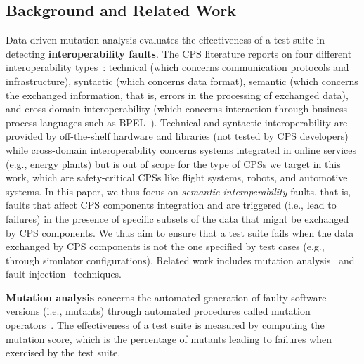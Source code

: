 
\subsection{Background and Related Work}
\label{sec:background}

Data-driven mutation analysis evaluates the effectiveness of a test suite in detecting \textbf{interoperability faults}. The CPS literature reports on four different interoperability types~\cite{Givehchi:2017}: technical (which concerns communication protocols and  infrastructure), syntactic (which concerns data format), semantic (which concerns the exchanged information, that is, errors in the processing of exchanged data), and cross-domain interoperability (which concerns interaction through business process languages such as BPEL~\cite{BPEL}).
Technical and syntactic interoperability are provided by off-the-shelf hardware and libraries
(not tested by CPS developers) 
 while cross-domain interoperability concerns systems integrated in online services (e.g., energy plants) but is out of scope for the type of CPSs we target in this work, which are safety-critical CPSs like flight systems, robots, and automotive systems. In this paper, we thus focus on \emph{semantic interoperability} faults,
 that is, faults that affect CPS components integration and are triggered (i.e., lead to failures) in the presence of specific subsets of the data that might be exchanged by CPS components. We thus aim to ensure that a test suite fails when the data exchanged by CPS components is not the one specified by test cases (e.g., through simulator configurations).
Related work includes mutation analysis~\cite{jia2010analysis,papadakis2019mutation} and fault injection~\cite{natella2016assessing} techniques.



\textbf{Mutation analysis} concerns the automated generation of faulty software versions (i.e., mutants) through automated procedures called mutation operators~\cite{jia2010analysis,papadakis2019mutation}. The effectiveness of a test suite is measured by computing the mutation score, which is the percentage of mutants leading to failures when exercised by the test suite.

